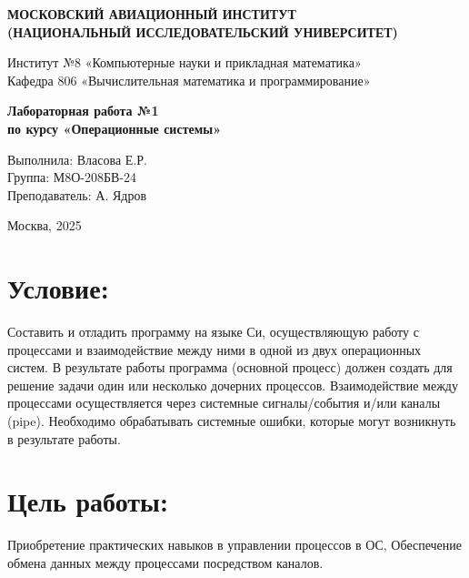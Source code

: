 \documentclass[14pt,a4paper]{extarticle}
\begin{document}
\begin{titlepage}
    \begin{center}
        
        \textbf{МОСКОВСКИЙ АВИАЦИОННЫЙ ИНСТИТУТ} \\
        \textbf{(НАЦИОНАЛЬНЫЙ ИССЛЕДОВАТЕЛЬСКИЙ УНИВЕРСИТЕТ)}
        
        \vspace{1cm}
        
        Институт №8 «Компьютерные науки и прикладная математика» \\
        Кафедра 806 «Вычислительная математика и программирование»
        
        \vspace{4cm}
        
        \textbf{Лабораторная работа №1} \\
        \textbf{по курсу «Операционные системы»}
        
        \vspace{8cm}
        
        \begin{flushright}
            Выполнила: Власова Е.Р. \\
            Группа: М8О-208БВ-24 \\
            Преподаватель: А. Ядров
        \end{flushright}
        
        \vfill
        
        Москва, 2025
        
    \end{center}
\end{titlepage}


\section*{Условие:}

Составить и отладить программу на языке Си, осуществляющую работу с процессами и взаимодействие между ними в одной из двух операционных систем. В результате работы программа (основной процесс) должен создать для решение задачи один или несколько дочерних процессов. Взаимодействие между процессами осуществляется через системные сигналы/события и/или каналы (pipe). Необходимо обрабатывать системные ошибки, которые могут возникнуть в результате работы.
\section*{Цель работы:}
 Приобретение практических навыков в управлении процессов в ОС, Обеспечение обмена данных между процессами посредством каналов.
\end{document}
